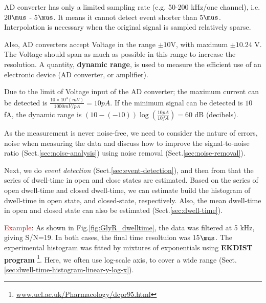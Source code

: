 \begin{framed}

  AD converter has only a limited sampling rate (e.g. 50-200 kHz/one channel),
  i.e. 20$\mus$ - 5$\mus$. It means it cannot detect event shorter than 5$\mus$.
  Interpolation is necessary when the original signal is sampled relatively
  sparse.

  Also, AD converters accept Voltage in the
  range $\pm 10$V, with maximum $\pm 10.24$ V. The Voltage should span
  as much as possible in this range to increase the resolution. A
  quantity, {\bf dynamic range}, is used to measure the efficient use
  of an electronic device (AD converter, or amplifier).

\end{framed}

Due to the limit of Voltage input of the AD converter; the
  maximum current can be detected is $\frac{10\times 10^3
    (mV)}{1000
    mV/pA}
  = 10 pA$. If the minimum signal can be detected is $10$ fA, the
  dynamic range is $(10-(-10)) \log (\frac{10 pA}{10 fA}) = 60$ dB
  (decibels).

As the measurement is never noise-free, we need to consider the nature of
errors, noise when measuring the data and  discuss how to improve the
signal-to-noise ratio (Sect.\ref{sec:noise-analysis}) using noise removal
(Sect.\ref{sec:noise-removal}).

Next, we do {\it event detection} (Sect.\ref{sec:event-detection}), and then
from that the series of dwell-time in open and close states are estimated.
Based on the series of open dwell-time and closed dwell-time, we can estimate
build the histogram of dwell-time in open state, and closed-state,
respectively. Also, the mean dwell-time in open and closed state can also be
estimated (Sect.\ref{sec:dwell-time}).

\textcolor{red}{Example}: As shown in Fig.\ref{fig:GlyR_dwelltime}, the data was
filtered at 5 kHz, giving S/N=19. In both cases, the final time resoltuion was
15$\mus$. The experimental histogram was fitted by mixtures of exponentials
using {\bf EKDIST program}
\footnote{\url{www.ucl.ac.uk/Pharmacology/dcpr95.html}}. Here, we often use
log-scale axis, to cover a wide range
(Sect.\ref{sec:dwell-time-histogram-linear-y-log-x}).

